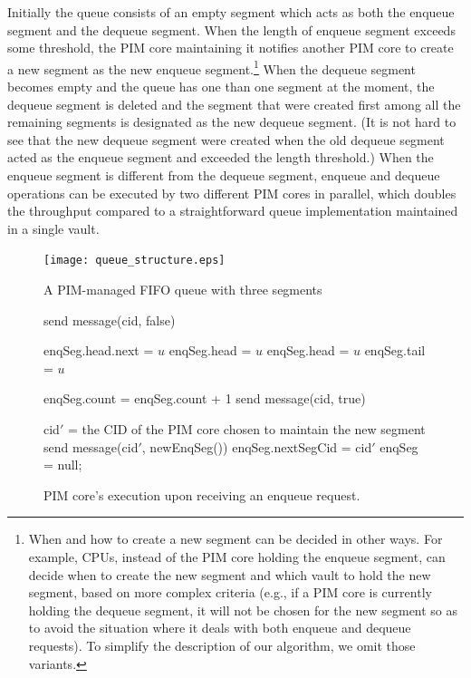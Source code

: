 \documentclass[11pt]{article}
\begin{document}
Initially the queue consists of an empty segment which acts as both the enqueue segment and 
the dequeue segment. 
When the length of enqueue segment exceeds some threshold, the PIM core maintaining it
notifies another PIM core to create a new segment as the new enqueue segment.\footnote{
When and how to create a new segment can be decided in other ways.
For example, CPUs, instead of the PIM core holding the enqueue segment, 
can decide when to create the new segment and which vault to hold the new segment, 
based on more complex criteria 
(e.g., if a PIM core is currently holding the dequeue segment, it will not be chosen for 
the new segment so as to avoid the situation where it deals with both enqueue and dequeue requests).
To simplify the description of our algorithm, we omit those variants.}
When the dequeue segment becomes empty and the queue has one than one segment at the moment, 
the dequeue segment is deleted and the segment that were created first 
among all the remaining segments is designated as the new dequeue segment. 
(It is not hard to see that the new dequeue segment were created when the old dequeue segment 
acted as the enqueue segment and exceeded the length threshold.)
When the enqueue segment is different from the dequeue segment, 
enqueue and dequeue operations can be executed by two different PIM cores 
in parallel, which doubles the throughput compared to a straightforward queue implementation 
maintained in a single vault.  

\begin{figure}[ht!]
\centering
\texttt{[image: queue\_structure.eps]}
\caption{A PIM-managed FIFO queue with three segments}
\label{figure:queue_structure}
\end{figure}



\begin{figure}
\begin{algorithm}[H]
\Begin
{
    {
        send message(cid, false)\;
    }
    {
        {
            enqSeg.head.next = $u$\;
            enqSeg.head = $u$\;
        }
        {
            enqSeg.head = $u$\;
            enqSeg.tail = $u$\;
        }

        enqSeg.count = enqSeg.count + 1\;
        send message(cid, true)\;

        {
            cid$'$ = the CID of the PIM core chosen to maintain the new segment\;
            send message(cid$'$, newEnqSeg())\;
            enqSeg.nextSegCid = cid$'$\;
            enqSeg = null;
        }
    }
}
\end{algorithm}
\caption{PIM core's execution upon receiving an enqueue request.}
\label{figure:enq}
\end{figure}
\end{document}
